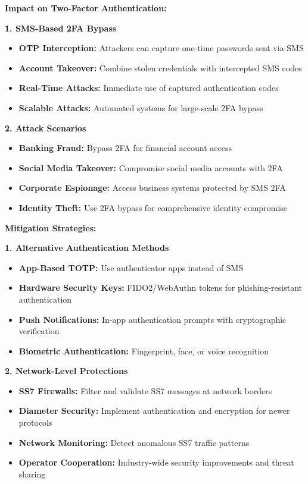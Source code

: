 \documentclass[12pt,a4paper]{article}
\begin{document}
\textbf{Impact on Two-Factor Authentication:}

\textbf{1. SMS-Based 2FA Bypass}
\begin{itemize}
    \item \textbf{OTP Interception:} Attackers can capture one-time passwords sent via SMS
    \item \textbf{Account Takeover:} Combine stolen credentials with intercepted SMS codes
    \item \textbf{Real-Time Attacks:} Immediate use of captured authentication codes
    \item \textbf{Scalable Attacks:} Automated systems for large-scale 2FA bypass
\end{itemize}

\textbf{2. Attack Scenarios}
\begin{itemize}
    \item \textbf{Banking Fraud:} Bypass 2FA for financial account access
    \item \textbf{Social Media Takeover:} Compromise social media accounts with 2FA
    \item \textbf{Corporate Espionage:} Access business systems protected by SMS 2FA
    \item \textbf{Identity Theft:} Use 2FA bypass for comprehensive identity compromise
\end{itemize}

\textbf{Mitigation Strategies:}

\textbf{1. Alternative Authentication Methods}
\begin{itemize}
    \item \textbf{App-Based TOTP:} Use authenticator apps instead of SMS
    \item \textbf{Hardware Security Keys:} FIDO2/WebAuthn tokens for phishing-resistant authentication
    \item \textbf{Push Notifications:} In-app authentication prompts with cryptographic verification
    \item \textbf{Biometric Authentication:} Fingerprint, face, or voice recognition
\end{itemize}

\textbf{2. Network-Level Protections}
\begin{itemize}
    \item \textbf{SS7 Firewalls:} Filter and validate SS7 messages at network borders
    \item \textbf{Diameter Security:} Implement authentication and encryption for newer protocols
    \item \textbf{Network Monitoring:} Detect anomalous SS7 traffic patterns
    \item \textbf{Operator Cooperation:} Industry-wide security improvements and threat sharing
\end{itemize}
\end{document}
